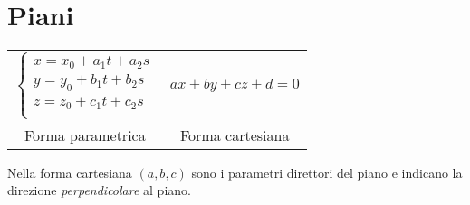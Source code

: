 \section{Piani}
\begin{tabular}{cc}
	$\begin{cases}
		x = x_0 + a_1t + a_2s \\[-0.3em]
		y = y_0 + b_1t + b_2s \\[-0.3em]
		z = z_0 + c_1t + c_2s \\
	\end{cases}$ &
	$ax + by + cz + d = 0$ \\
	Forma parametrica & Forma cartesiana \\
\end{tabular}

Nella forma cartesiana $(a, b, c)$ sono i parametri direttori del piano e indicano la direzione
\emph{perpendicolare} al piano.
